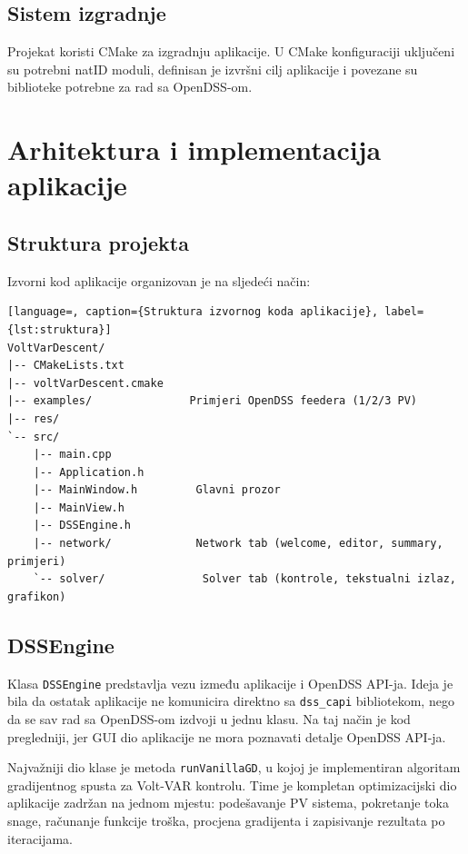 \documentclass[12pt,oneside, a4paper]{book}
\begin{document}
\section{Sistem izgradnje}

Projekat koristi CMake za izgradnju aplikacije. U CMake konfiguraciji uključeni su potrebni natID moduli, definisan je izvršni cilj aplikacije i povezane su biblioteke potrebne za rad sa OpenDSS-om.

\chapter{Arhitektura i implementacija aplikacije}

\section{Struktura projekta}

Izvorni kod aplikacije organizovan je na sljedeći način:

\begin{lstlisting}[language=, caption={Struktura izvornog koda aplikacije}, label={lst:struktura}]
VoltVarDescent/
|-- CMakeLists.txt
|-- voltVarDescent.cmake
|-- examples/               Primjeri OpenDSS feedera (1/2/3 PV)
|-- res/
`-- src/
    |-- main.cpp
    |-- Application.h
    |-- MainWindow.h         Glavni prozor
    |-- MainView.h 
    |-- DSSEngine.h
    |-- network/             Network tab (welcome, editor, summary, primjeri)
    `-- solver/               Solver tab (kontrole, tekstualni izlaz, grafikon)
\end{lstlisting}

\section{DSSEngine}

Klasa \texttt{DSSEngine} predstavlja vezu između aplikacije i OpenDSS API-ja. Ideja je bila da ostatak aplikacije ne komunicira direktno sa \texttt{dss\_capi} bibliotekom, nego da se sav rad sa OpenDSS-om izdvoji u jednu klasu. Na taj način je kod pregledniji, jer GUI dio aplikacije ne mora poznavati detalje OpenDSS API-ja.

Najvažniji dio klase je metoda \texttt{runVanillaGD}, u kojoj je implementiran algoritam gradijentnog spusta za Volt-VAR kontrolu. Time je kompletan optimizacijski dio aplikacije zadržan na jednom mjestu: podešavanje PV sistema, pokretanje toka snage, računanje funkcije troška, procjena gradijenta i zapisivanje rezultata po iteracijama.
\end{document}
